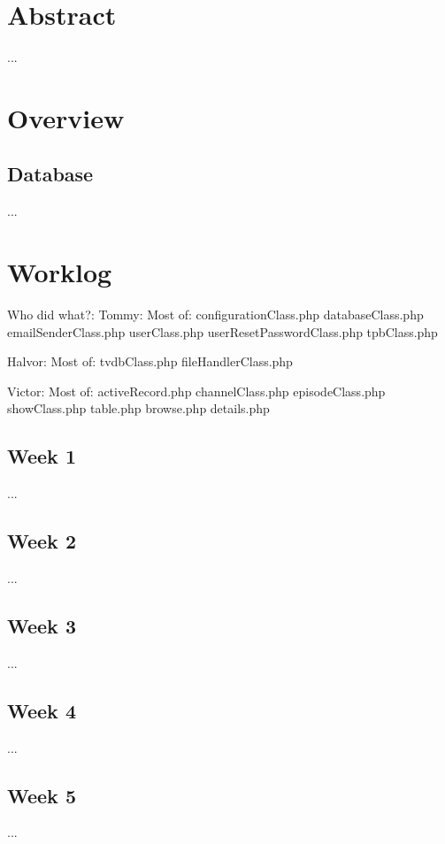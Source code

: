 \documentclass[12pt]{article}
\begin{document}


\tableofcontents

\section{Abstract}
...

\section{Overview}
\subsection{Database}
...

\section{Worklog}
Who did what?:
Tommy:
	Most of:
		configurationClass.php
		databaseClass.php
		emailSenderClass.php
		userClass.php
		userResetPasswordClass.php
		tpbClass.php

Halvor:
	Most of:
		tvdbClass.php
		fileHandlerClass.php
		
Victor:
	Most of:
		activeRecord.php
		channelClass.php
		episodeClass.php
		showClass.php
		table.php
		browse.php
		details.php
		
		

\subsection{Week 1}
...
\subsection{Week 2}
...
\subsection{Week 3}
...
\subsection{Week 4}
...
\subsection{Week 5}
...
\end{document}
